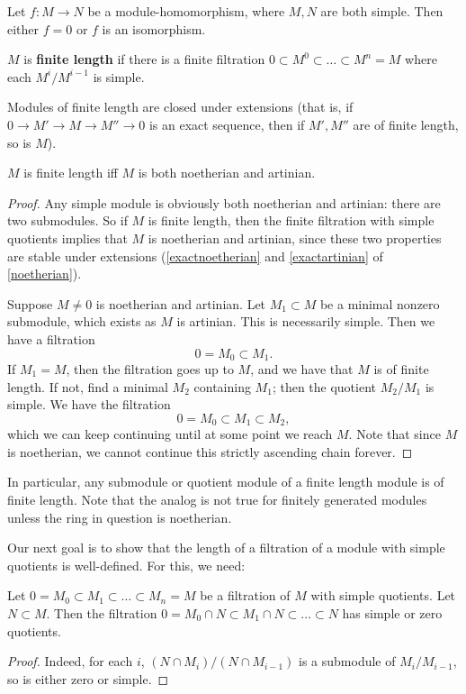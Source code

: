 \begin{exercise} Let $f: M \to N$ be a module-homomorphism,
where $M, N$ are both simple. Then either $f =0$ or $f$ is an isomorphism. 
\end{exercise} 

\begin{definition} 
$M$ is \textbf{finite length} if there is a finite filtration $0 \subset M^0
\subset \dots \subset M^n = M$ where each $M^i/M^{i-1}$ is simple.
\end{definition} 

\begin{exercise} 
Modules of finite length are closed under extensions (that is, if $0 \to M'
\to M \to M'' \to 0$ is an exact sequence, then if $M', M''$ are of finite
length, so is $M$).  
\end{exercise} 

\begin{proposition} 
$M$ is finite length iff $M$ is both noetherian and artinian.
\end{proposition} 
\begin{proof} 
Any simple module is obviously both noetherian and artinian: there are two
submodules. So if $M$ is finite length, then the finite filtration with simple
quotients implies that $M$ is noetherian and artinian, since these two
properties are stable under extensions (\cref{exactnoetherian}
and \cref{exactartinian} of \cref{noetherian}).

Suppose $M \neq 0$ is noetherian and artinian. Let $M_1 \subset M$ be a minimal
nonzero submodule, which exists as $M$ is artinian. This is necessarily simple. Then we have a filtration
\[ 0 = M_0 \subset M_1.  \]
If $M_1 = M$, then the filtration goes up to $M$, and we have that $M$ is of
finite length. If not, find a minimal $M_2$ containing $M_1$; then the quotient
$M_2/M_1$ is simple. We have the filtration
\[ 0 = M_0 \subset M_1 \subset M_2,  \]
which we can keep continuing until at some point we reach $M$. Note that since
$M$ is noetherian, we cannot continue this strictly ascending chain forever. 
\end{proof} 

\begin{exercise} 
In particular, any submodule or quotient module of a finite length module is
of finite length. Note that the analog is not true for finitely generated
modules unless the ring in question is noetherian.
\end{exercise} 

Our next goal is to show that the length of a filtration of a module with
simple quotients is well-defined.
For this, we need:
\begin{lemma}  \label{simplefiltrationint}
Let $0 = M_0 \subset M_1 \subset \dots \subset M_n = M$ be  a filtration of
$M$ with simple quotients. Let $N \subset M$. Then the filtration
$0 = M_0 \cap N \subset M_1 \cap N \subset \dots \subset N$ has simple or zero
quotients. 
\end{lemma} 
\begin{proof} 
Indeed, for each $i$, $(N \cap M_i)/(N \cap M_{i-1})$ is a submodule of
$M_i / M_{i-1}$, so is either zero or simple.
\end{proof} 


